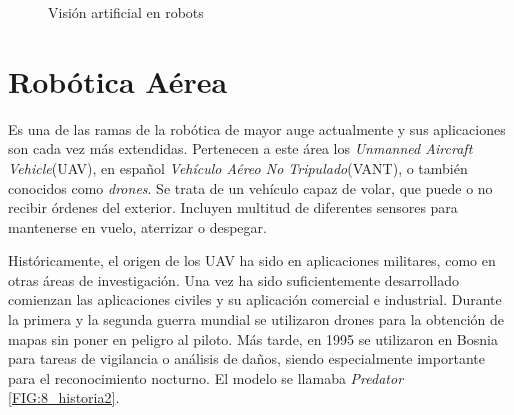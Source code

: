 \begin{figure}[hbtp]
	\centering
	\hspace{10mm}
	\caption{Visión artificial en robots}
	
	\label{FIG:5_vision}
\end{figure}


\section{Robótica Aérea}\label{SEC:Robotica Aerea}

Es una de las ramas de la robótica de mayor auge actualmente y sus aplicaciones son cada vez más extendidas. Pertenecen a este área los \textit{Unmanned Aircraft Vehicle}(UAV), en español \textit{Vehículo Aéreo No Tripulado}(VANT), o también conocidos como \textit{drones}. Se trata de un vehículo capaz de volar, que puede o no recibir órdenes del exterior. Incluyen multitud de diferentes sensores para mantenerse en vuelo, aterrizar o despegar.

Históricamente, el origen de los UAV ha sido en aplicaciones militares, como en otras áreas de investigación. Una vez ha sido suficientemente desarrollado comienzan las aplicaciones civiles y su aplicación comercial e industrial.
Durante la primera y la segunda guerra mundial se utilizaron drones para la obtención de mapas sin poner en peligro al piloto. Más tarde, en 1995 se utilizaron en Bosnia para tareas de vigilancia o análisis de daños, siendo especialmente importante para el reconocimiento nocturno. El modelo se llamaba \textit{Predator} \ref{FIG:8_historia2}.

